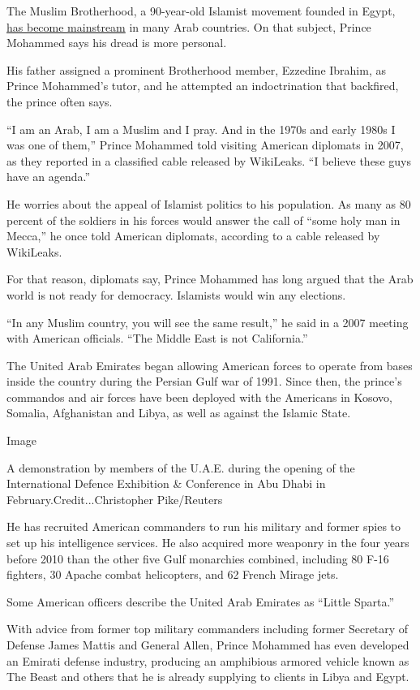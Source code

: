 The Muslim Brotherhood, a 90-year-old Islamist movement founded in
Egypt,
\href{https://www.nytimes.com/2019/04/30/world/middleeast/is-the-muslim-brotherhood-terrorist.html}{has
become mainstream} in many Arab countries. On that subject, Prince
Mohammed says his dread is more personal.

His father assigned a prominent Brotherhood member, Ezzedine Ibrahim, as
Prince Mohammed's tutor, and he attempted an indoctrination that
backfired, the prince often says.

``I am an Arab, I am a Muslim and I pray. And in the 1970s and early
1980s I was one of them,'' Prince Mohammed told visiting American
diplomats in 2007, as they reported in a classified cable released by
WikiLeaks. ``I believe these guys have an agenda.''

He worries about the appeal of Islamist politics to his population. As
many as 80 percent of the soldiers in his forces would answer the call
of ``some holy man in Mecca,'' he once told American diplomats,
according to a cable released by WikiLeaks.

For that reason, diplomats say, Prince Mohammed has long argued that the
Arab world is not ready for democracy. Islamists would win any
elections.

``In any Muslim country, you will see the same result,'' he said in a
2007 meeting with American officials. ``The Middle East is not
California.''

The United Arab Emirates began allowing American forces to operate from
bases inside the country during the Persian Gulf war of 1991. Since
then, the prince's commandos and air forces have been deployed with the
Americans in Kosovo, Somalia, Afghanistan and Libya, as well as against
the Islamic State.

Image

A demonstration by members of the U.A.E. during the opening of the
International Defence Exhibition \& Conference in Abu Dhabi in
February.Credit...Christopher Pike/Reuters

He has recruited American commanders to run his military and former
spies to set up his intelligence services. He also acquired more
weaponry in the four years before 2010 than the other five Gulf
monarchies combined, including 80 F-16 fighters, 30 Apache combat
helicopters, and 62 French Mirage jets.

Some American officers describe the United Arab Emirates as ``Little
Sparta.''

With advice from former top military commanders including former
Secretary of Defense James Mattis and General Allen, Prince Mohammed has
even developed an Emirati defense industry, producing an amphibious
armored vehicle known as The Beast and others that he is already
supplying to clients in Libya and Egypt.

